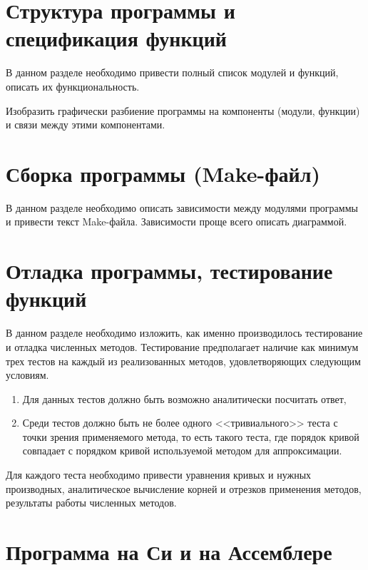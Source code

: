 \documentclass[a4paper,12pt,titlepage,finall]{article}
\begin{document}
\newpage

\section{Структура программы и спецификация функций}

В данном разделе необходимо привести полный список модулей и функций,
описать их функциональность.

Изобразить графически разбиение программы на компоненты (модули, функции)
и связи между этими компонентами.

\newpage

\section{Сборка программы (Make-файл)}

В данном разделе необходимо описать зависимости между модулями программы
и привести текст Make-файла. Зависимости проще всего описать диаграммой.

\newpage

\section{Отладка программы, тестирование функций}

В данном разделе необходимо изложить, как именно производилось тестирование
и отладка численных методов. Тестирование предполагает наличие как минимум
трех тестов на каждый из реализованных методов, удовлетворяющих следующим
условиям.
\begin{enumerate}
\item Для данных тестов должно быть возможно аналитически посчитать ответ,
\item Среди тестов должно быть не более одного <<тривиального>> теста
    с точки зрения применяемого метода, то есть такого теста, где порядок
    кривой совпадает с порядком кривой используемой методом для аппроксимации.
\end{enumerate}

Для каждого теста необходимо привести уравнения кривых и нужных производных,
аналитическое вычисление корней и отрезков применения методов, результаты
работы численных методов.

\newpage

\section{Программа на Си и на Ассемблере}
\end{document}
